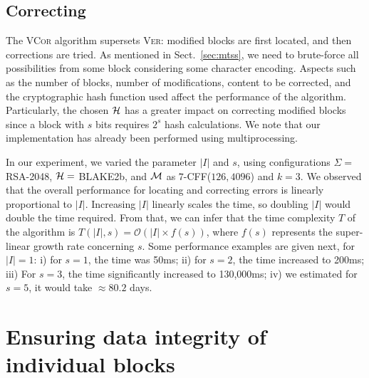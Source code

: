 \documentclass[12pt]{article}
\begin{document}


\subsection{Correcting}
\label{sec:correction}

The \textsc{VCor} algorithm supersets \textsc{Ver}: modified blocks are first located, and then corrections are tried. As mentioned in Sect.~\ref{sec:mtss}, we need to brute-force all possibilities from some block considering some character encoding. Aspects such as the number of blocks, number of modifications, content to be corrected, and the cryptographic hash function used affect the performance of the algorithm. Particularly, the chosen $\mathcal{H}$ has a greater impact on correcting modified blocks since a block with $s$ bits requires $2^s$ hash calculations. We note that our implementation has already been performed using multiprocessing.

In our experiment, we varied the parameter $|I|$ and $s$, using configurations $\Sigma =$ RSA-2048, $\mathcal{H} =$ BLAKE2b, and $\mathcal{M}$ as $7$-CFF($126, 4096$) and $k = 3$. We observed that the overall performance for locating and correcting errors is linearly proportional to $|I|$. Increasing $|I|$ linearly scales the time, so doubling $|I|$ would double the time required. From that, we can infer that the time complexity $T$ of the algorithm is $T(|I|, s) = \mathcal{O}(|I| \times f(s))$, where $f(s)$ represents the super-linear growth rate concerning $s$. Some performance examples are given next, for $|I| = 1$: i) for $s = 1$, the time was 50ms; ii) for $s = 2$, the time increased to 200ms; iii) For $s = 3$, the time significantly increased to 130,000ms; iv) we estimated for $s = 5$, it would take $\approx 80.2$ days.


% 

\section{Ensuring data integrity of individual blocks}
\label{sec:partial-data-integrity}
\end{document}

